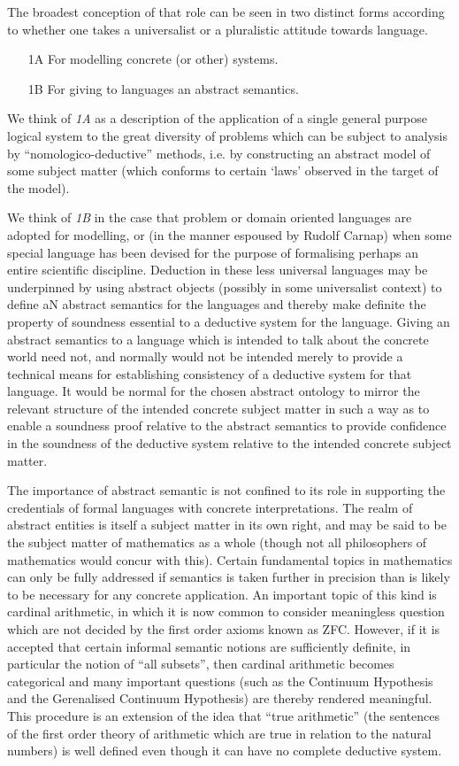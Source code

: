 The broadest conception of that role can be seen in two distinct forms according to whether one takes a universalist or a pluralistic attitude towards language.

\begin{itemize}
\item[1A] For modelling concrete (or other) systems.
\item[1B] For giving to languages an abstract semantics.
\end{itemize}

We think of \emph{1A} as a description of the application of a single general purpose logical system to the great diversity of problems which can be subject to analysis by ``nomologico-deductive'' methods, i.e. by constructing an abstract model of some subject matter (which conforms to certain `laws' observed in the target of the model).

We think of \emph{1B} in the case that problem or domain oriented languages are adopted for modelling, or (in the manner espoused by Rudolf Carnap) when some special language has been devised for the purpose of formalising perhaps an entire scientific discipline.
Deduction in these less universal languages may be underpinned by using abstract objects (possibly in some universalist context) to define aN abstract semantics for the languages and thereby make definite the property of soundness essential to a deductive system for the language.
Giving an abstract semantics to a language which is intended to talk about the concrete world need not, and normally would not be intended merely to provide a technical means for establishing consistency of a deductive system for that language.
It would be normal for the chosen abstract ontology to mirror the relevant structure of the intended concrete subject matter in such a way as to enable a soundness proof relative to the abstract semantics to provide confidence in the soundness of the deductive system relative to the intended concrete subject matter.

The importance of abstract semantic is not confined to its role in supporting the credentials of formal languages with concrete interpretations.
The realm of abstract entities is itself a subject matter in its own right, and may be said to be the subject matter of mathematics as a whole (though not all philosophers of mathematics would concur with this).
Certain fundamental topics in mathematics can only be fully addressed if semantics is taken further in precision than is likely to be necessary for any concrete application.
An important topic of this kind is cardinal arithmetic, in which it is now common to consider meaningless question which are not decided by the first order axioms known as ZFC.
However, if it is accepted that certain informal semantic notions are sufficiently definite, in particular the notion of ``all subsets'', then cardinal arithmetic becomes categorical and many important questions (such as the Continuum Hypothesis and the Gerenalised Continuum Hypothesis) are thereby rendered meaningful.
This procedure is an extension of the idea that ``true arithmetic'' (the sentences of the first order theory of arithmetic which are true in relation to the natural numbers) is well defined even though it can have no complete deductive system.

